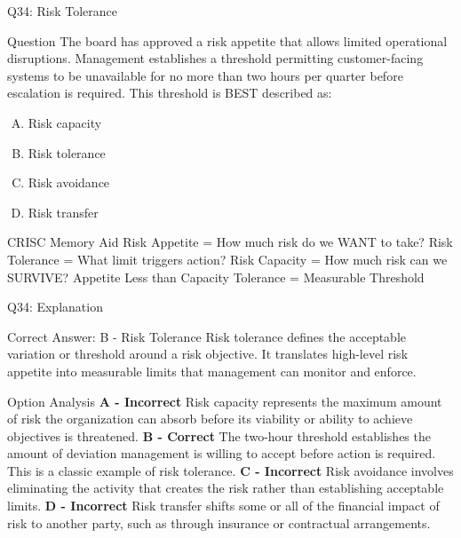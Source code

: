 \documentclass{beamer}
\begin{document}
	
	\begin{frame}{Q34: Risk Tolerance} \begin{block}{Question} The board has approved a risk appetite that allows limited operational disruptions. Management establishes a threshold permitting customer-facing systems to be unavailable for no more than two hours per quarter before escalation is required. This threshold is BEST described as: \end{block} \begin{enumerate}[(A)] \item Risk capacity \item Risk tolerance \item Risk avoidance \item Risk transfer \end{enumerate} \begin{block}{CRISC Memory Aid} Risk Appetite = How much risk do we WANT to take? \vspace{0.1cm} Risk Tolerance = What limit triggers action? \vspace{0.1cm} Risk Capacity = How much risk can we SURVIVE? \vspace{0.15cm} Appetite Less than Capacity Tolerance = Measurable Threshold \end{block} 
	 \end{frame} \begin{frame}[shrink=10]{Q34: Explanation} \footnotesize \begin{block}{Correct Answer: B - Risk Tolerance} Risk tolerance defines the acceptable variation or threshold around a risk objective. It translates high-level risk appetite into measurable limits that management can monitor and enforce. \end{block} \begin{block}{Option Analysis} \textbf{A - Incorrect} Risk capacity represents the maximum amount of risk the organization can absorb before its viability or ability to achieve objectives is threatened. \vspace{0.15cm} \textbf{B - Correct} The two-hour threshold establishes the amount of deviation management is willing to accept before action is required. This is a classic example of risk tolerance. \vspace{0.15cm} \textbf{C - Incorrect} Risk avoidance involves eliminating the activity that creates the risk rather than establishing acceptable limits. \vspace{0.15cm} \textbf{D - Incorrect} Risk transfer shifts some or all of the financial impact of risk to another party, such as through insurance or contractual arrangements. \end{block}  \end{frame}
	
\end{document}
